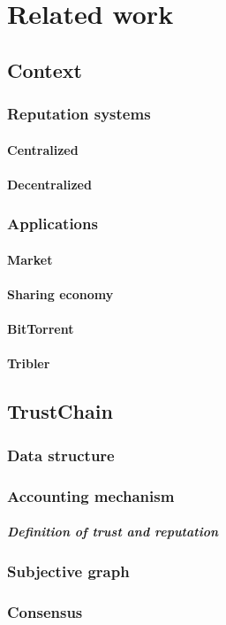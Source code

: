 \chapter{Related work}

\section{Context}

\subsection{Reputation systems}

\subsubsection{Centralized}
\subsubsection{Decentralized}

\subsection{Applications}

\subsubsection{Market}
\subsubsection{Sharing economy}
\subsubsection{BitTorrent}
\subsubsection{Tribler}

\section{TrustChain}

\subsection{Data structure}
\subsection{Accounting mechanism}
\paragraph{Definition of trust and reputation}
\subsection{Subjective graph}
\subsection{Consensus}

